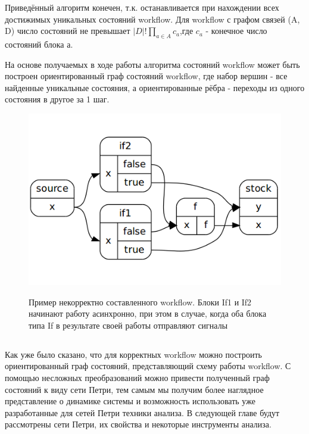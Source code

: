 \documentclass[a4paper,12pt]{article}
\begin{document}
 Приведённый алгоритм конечен, т.к. останавливается при нахождении всех достижимых уникальных состояний workflow. Для workflow с графом связей (A, D) число состояний не превышает $|D|!\prod_{a \in A} c_{a}$,где  $c_{a}$ - конечное число состояний блока а.

На основе получаемых в ходе работы алгоритма состояний workflow может быть построен ориентированный граф состояний workflow, где набор вершин - все найденные уникальные состояния, а ориентированные рёбра - переходы из одного состояния в другое за 1 шаг.


\begin{figure}[!h]
\caption{Пример некорректно составленного workflow. Блоки If1 и If2 начинают работу асинхронно, при этом в случае, когда оба блока типа If в результате своей работы отправляют сигналы }
\centering
\includegraphics[scale=0.35]{race_workflow.png}
\label{pic:race_cond}
\end{figure}

\subsection*{}
Как уже было сказано, что для корректных workflow можно построить ориентированный граф состояний, представляющий схему работы workflow.
С помощью несложных преобразований можно привести полученный граф состояний к виду сети Петри, тем самым мы получим более наглядное представление о динамике системы и возможность использовать уже разработанные для сетей Петри техники анализа.
В следующей главе будут рассмотрены сети Петри, их свойства и некоторые инструменты анализа.
\end{document}
